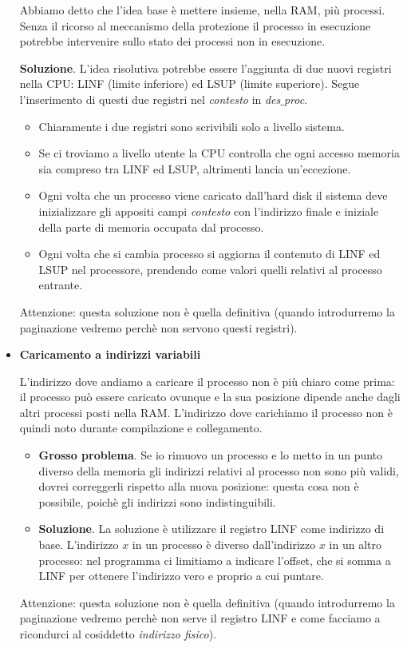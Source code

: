 \begin{itemize}
	Abbiamo detto che l'idea base è mettere insieme, nella RAM, più processi. Senza il ricorso al meccanismo della protezione il processo in esecuzione potrebbe intervenire sullo stato dei processi non in esecuzione.
	
	\noindent \textbf{Soluzione}. L'idea risolutiva potrebbe essere l'aggiunta di due nuovi registri nella CPU: LINF (limite inferiore) ed LSUP (limite superiore). Segue l'inserimento di questi due registri nel \emph{contesto} in \emph{des$\_$proc}. \begin{itemize} 
		\item Chiaramente i due registri sono scrivibili solo a livello sistema.
		\item Se ci troviamo a livello utente la CPU controlla che ogni accesso memoria sia compreso tra LINF ed LSUP, altrimenti lancia un'eccezione.
		\item Ogni volta che un processo viene caricato dall'hard disk il sistema deve inizializzare gli appositi campi \emph{contesto} con l'indirizzo finale e iniziale della parte di memoria occupata dal processo.
		\item Ogni volta che si cambia processo si aggiorna il contenuto di LINF ed LSUP nel processore, prendendo come valori quelli relativi al processo entrante.
	\end{itemize}  
	Attenzione: questa soluzione non è quella definitiva (quando introdurremo la paginazione vedremo perchè non servono questi registri).
	
	\item \textbf{Caricamento a indirizzi variabili}
	
	L'indirizzo dove andiamo a caricare il processo non è più chiaro come prima: il processo può essere caricato ovunque e la sua posizione dipende anche dagli altri processi posti nella RAM. L'indirizzo dove carichiamo il processo non è quindi noto durante compilazione e collegamento.
	\begin{itemize}
		\item \textbf{Grosso problema}. Se io rimuovo un processo e lo metto in un punto diverso della memoria gli indirizzi relativi al processo non sono più validi, dovrei correggerli rispetto alla nuova posizione: questa cosa non è possibile, poichè gli indirizzi sono indistinguibili.
		\item \textbf{Soluzione}. La soluzione è utilizzare il registro LINF come indirizzo di base. L'indirizzo $x$ in un processo è diverso dall'indirizzo $x$ in un altro processo: nel programma ci limitiamo a indicare l'offset, che si somma a LINF per ottenere l'indirizzo vero e proprio a cui puntare. 
	\end{itemize}
	Attenzione: questa soluzione non è quella definitiva (quando introdurremo la paginazione vedremo perchè non serve il registro LINF e come facciamo a ricondurci al cosiddetto \emph{indirizzo fisico}).
\end{itemize}
